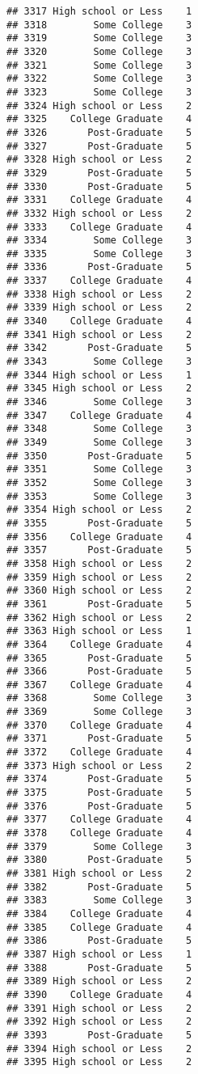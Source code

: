 \documentclass[
]{article}
\begin{document}
\begin{verbatim}
## 3317 High school or Less    1
## 3318        Some College    3
## 3319        Some College    3
## 3320        Some College    3
## 3321        Some College    3
## 3322        Some College    3
## 3323        Some College    3
## 3324 High school or Less    2
## 3325    College Graduate    4
## 3326       Post-Graduate    5
## 3327       Post-Graduate    5
## 3328 High school or Less    2
## 3329       Post-Graduate    5
## 3330       Post-Graduate    5
## 3331    College Graduate    4
## 3332 High school or Less    2
## 3333    College Graduate    4
## 3334        Some College    3
## 3335        Some College    3
## 3336       Post-Graduate    5
## 3337    College Graduate    4
## 3338 High school or Less    2
## 3339 High school or Less    2
## 3340    College Graduate    4
## 3341 High school or Less    2
## 3342       Post-Graduate    5
## 3343        Some College    3
## 3344 High school or Less    1
## 3345 High school or Less    2
## 3346        Some College    3
## 3347    College Graduate    4
## 3348        Some College    3
## 3349        Some College    3
## 3350       Post-Graduate    5
## 3351        Some College    3
## 3352        Some College    3
## 3353        Some College    3
## 3354 High school or Less    2
## 3355       Post-Graduate    5
## 3356    College Graduate    4
## 3357       Post-Graduate    5
## 3358 High school or Less    2
## 3359 High school or Less    2
## 3360 High school or Less    2
## 3361       Post-Graduate    5
## 3362 High school or Less    2
## 3363 High school or Less    1
## 3364    College Graduate    4
## 3365       Post-Graduate    5
## 3366       Post-Graduate    5
## 3367    College Graduate    4
## 3368        Some College    3
## 3369        Some College    3
## 3370    College Graduate    4
## 3371       Post-Graduate    5
## 3372    College Graduate    4
## 3373 High school or Less    2
## 3374       Post-Graduate    5
## 3375       Post-Graduate    5
## 3376       Post-Graduate    5
## 3377    College Graduate    4
## 3378    College Graduate    4
## 3379        Some College    3
## 3380       Post-Graduate    5
## 3381 High school or Less    2
## 3382       Post-Graduate    5
## 3383        Some College    3
## 3384    College Graduate    4
## 3385    College Graduate    4
## 3386       Post-Graduate    5
## 3387 High school or Less    1
## 3388       Post-Graduate    5
## 3389 High school or Less    2
## 3390    College Graduate    4
## 3391 High school or Less    2
## 3392 High school or Less    2
## 3393       Post-Graduate    5
## 3394 High school or Less    2
## 3395 High school or Less    2

\end{verbatim}
\end{document}
